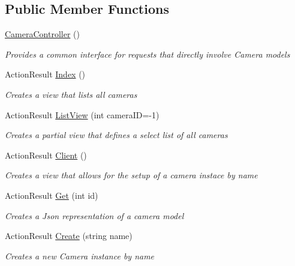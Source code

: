 \subsection*{Public Member Functions}
\begin{DoxyCompactItemize}
\item 
\mbox{\hyperlink{class_eagle_eye_1_1_controllers_1_1_camera_controller_a6b73ce65988171c22a039de9de4ac2c0}{Camera\+Controller}} ()
\begin{DoxyCompactList}\small\item\em Provides a common interface for requests that directly involve Camera models \end{DoxyCompactList}\item 
Action\+Result \mbox{\hyperlink{class_eagle_eye_1_1_controllers_1_1_camera_controller_aef90502fd5923368a7ef1773280e4b32}{Index}} ()
\begin{DoxyCompactList}\small\item\em Creates a view that lists all cameras \end{DoxyCompactList}\item 
Action\+Result \mbox{\hyperlink{class_eagle_eye_1_1_controllers_1_1_camera_controller_a8f80527595c1e7c5e8bec2257ade1b78}{List\+View}} (int camera\+ID=-\/1)
\begin{DoxyCompactList}\small\item\em Creates a partial view that defines a select list of all cameras \end{DoxyCompactList}\item 
Action\+Result \mbox{\hyperlink{class_eagle_eye_1_1_controllers_1_1_camera_controller_a22c71acb769ab89d66c816e8af2dd55e}{Client}} ()
\begin{DoxyCompactList}\small\item\em Creates a view that allows for the setup of a camera instace by name \end{DoxyCompactList}\item 
Action\+Result \mbox{\hyperlink{class_eagle_eye_1_1_controllers_1_1_camera_controller_a6dfc692f61939468dffcf13b5899ed5f}{Get}} (int id)
\begin{DoxyCompactList}\small\item\em Creates a Json representation of a camera model \end{DoxyCompactList}\item 
Action\+Result \mbox{\hyperlink{class_eagle_eye_1_1_controllers_1_1_camera_controller_a07c68e0e159c17b1725489ddf54f9f1d}{Create}} (string name)
\begin{DoxyCompactList}\small\item\em Creates a new Camera instance by name \end{DoxyCompactList}\item 

\end{DoxyCompactItemize}
